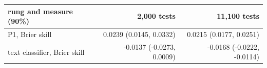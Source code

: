 \begin{tabular}{lrr}
\toprule
rung and measure (90\%) & 2,000 tests & 11,100 tests \\
\midrule
P1, Brier skill & 0.0239 (0.0145, 0.0332) & 0.0215 (0.0177, 0.0251) \\
text classifier, Brier skill & -0.0137 (-0.0273, 0.0009) & -0.0168 (-0.0222, -0.0114) \\

\end{tabular}
